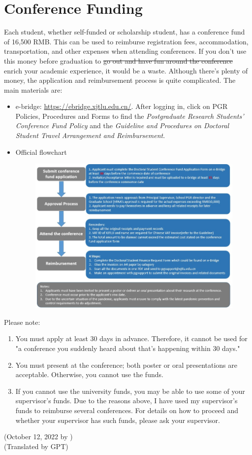 \section{Conference Funding}
\label{sec.fund}

Each student, whether self-funded or scholarship student, has a conference fund of 16,500 RMB. This can be used to reimburse registration fees, accommodation, transportation, and other expenses when attending conferences. If you don't use this money before graduation to \sout{go out and have fun around the conference} enrich your academic experience, it would be a waste. Although there's plenty of money, the application and reimbursement process is quite complicated. The main materials are:

\begin{itemize}
    \item e-bridge: \url{https://ebridge.xjtlu.edu.cn/}. After logging in, click on PGR Policies, Procedures and Forms to find the \textit{Postgraduate Research Students' Conference Fund Policy} and the \textit{Guideline and Procedures on Doctoral Student Travel Arrangement and Reimbursement}.
    \item Official flowchart
    \begin{figure}[H]
        \centering
        \includegraphics[width=0.9\columnwidth]{author-folder/Kai.Wu/fund-flowchart.jpg}
    \end{figure}
\end{itemize}

Please note:
\begin{enumerate}
    \item You must apply at least 30 days in advance. Therefore, it cannot be used for "a conference you suddenly heard about that's happening within 30 days."
    \item You must present at the conference; both poster or oral presentations are acceptable. Otherwise, you cannot use the funds.
    \item If you cannot use the university funds, you may be able to use some of your supervisor's funds. Due to the reasons above, I have used my supervisor's funds to reimburse several conferences. For details on how to proceed and whether your supervisor has such funds, please ask your supervisor.
\end{enumerate}

\begin{flushright}
(October 12, 2022 by \Wu) \\
(Translated by GPT)
\end{flushright}

